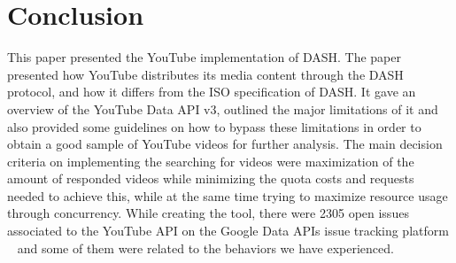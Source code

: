 \section{Conclusion}
This paper presented the YouTube implementation of DASH. The paper presented how
YouTube distributes its media content through the DASH protocol, and how it
differs from the ISO specification of DASH. It gave an overview of the YouTube
Data API v3, outlined the major limitations of it and also provided some
guidelines on how to bypass these limitations in order to obtain a good sample
of YouTube videos for further analysis. The main decision criteria on
implementing the searching for videos were maximization of the amount of
responded videos while minimizing the quota costs and requests needed to achieve
this, while at the same time trying to maximize resource usage through
concurrency. While creating the tool, there were 2305 open issues associated to
the YouTube API on the Google Data APIs issue tracking platform
~\cite{conclusion:gdataissue} and some of them were related to the behaviors we
have experienced.
